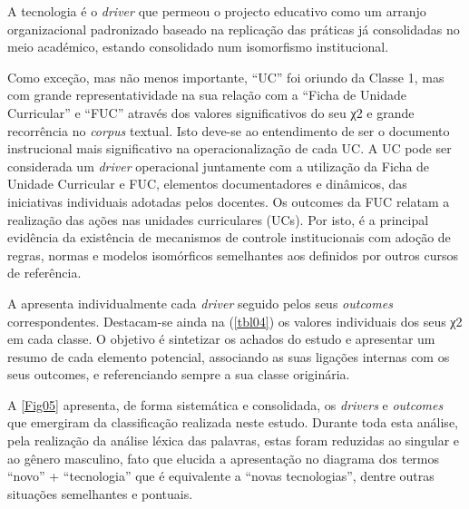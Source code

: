 \documentclass{textolivre}
\begin{document}
A tecnologia é o \textit{driver} que permeou o projecto educativo como um arranjo organizacional padronizado baseado na replicação das práticas já consolidadas no meio académico, estando consolidado num isomorfismo institucional.

Como exceção, mas não menos importante, “UC” foi oriundo da Classe 1, mas com grande representatividade na sua relação com a “Ficha de Unidade Curricular” e “FUC” através dos valores significativos do seu χ2 e grande recorrência no \textit{corpus} textual. Isto deve-se ao entendimento de ser o documento instrucional mais significativo na operacionalização de cada UC. A UC pode ser considerada um \textit{driver} operacional juntamente com a utilização da Ficha de Unidade Curricular e FUC, elementos documentadores e dinâmicos, das iniciativas individuais adotadas pelos docentes. Os outcomes da FUC relatam a realização das ações nas unidades curriculares (UCs). Por isto, é a principal evidência da existência de mecanismos de controle institucionais com adoção de regras, normas e modelos isomórficos semelhantes aos definidos por outros cursos de referência.



A  apresenta individualmente cada \textit{driver} seguido pelos seus \textit{outcomes} correspondentes. Destacam-se ainda na (\cref{tbl04}) os valores individuais dos seus χ2 em cada classe. O objetivo é sintetizar os achados do estudo e apresentar um resumo de cada elemento potencial, associando as suas ligações internas com os seus outcomes, e referenciando sempre a sua classe originária.

A \cref{Fig05} apresenta, de forma sistemática e consolidada, os \textit{drivers} e \textit{outcomes} que emergiram da classificação realizada neste estudo. Durante toda esta análise, pela realização da análise léxica das palavras, estas foram reduzidas ao singular e ao gênero masculino, fato que elucida a apresentação no diagrama dos termos “novo” + “tecnologia” que é equivalente a “novas tecnologias”, dentre outras situações semelhantes e pontuais.
\end{document}
